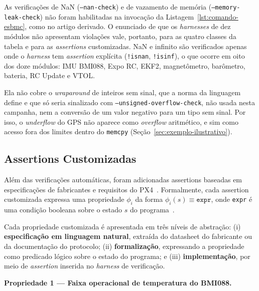 As verificações de NaN (\texttt{--nan-check}) e de vazamento de memória
(\texttt{--memory-leak-check}) não foram habilitadas na invocação da
Listagem~\ref{lst:comando-esbmc}, como no artigo derivado. O enunciado de que
os \textit{harnesses} de dez módulos não apresentam violações vale, portanto, para
as quatro classes da tabela e para as \textit{assertions} customizadas. NaN e
infinito são verificados apenas onde o \textit{harness} tem \textit{assertion}
explícita (\texttt{!isnan}, \texttt{!isinf}), o que ocorre em oito dos doze
módulos: IMU BMI088, Expo RC, EKF2, magnetômetro, barômetro, bateria, RC Update e
VTOL.

Ela não cobre o \textit{wraparound} de inteiros sem sinal, que a norma da
linguagem define e que só seria sinalizado com \texttt{--unsigned-overflow-check},
não usada nesta campanha, nem a conversão de um valor negativo para um tipo sem
sinal. Por isso, o \textit{underflow} do GPS não aparece como
\textit{overflow} aritmético, e sim como acesso fora dos limites dentro do
\texttt{memcpy} (Seção~\ref{sec:exemplo-ilustrativo}).

\subsection{Assertions Customizadas}

Além das verificações automáticas, foram adicionadas assertions baseadas em
especificações de fabricantes e requisitos do PX4~\cite{PX4_Documentation}.
Formalmente, cada assertion customizada expressa uma propriedade
$\phi_i$ da forma $\phi_i(s) \equiv \texttt{expr}$, onde \texttt{expr} é uma
condição booleana sobre o estado $s$ do programa~\cite{Cordeiro2012}.

Cada propriedade customizada é apresentada em três níveis de abstração: (i) \textbf{especificação em linguagem natural}, extraída do datasheet do fabricante ou da documentação do protocolo; (ii) \textbf{formalização}, expressando a propriedade como predicado lógico sobre o estado do programa; e (iii) \textbf{implementação}, por meio de \textit{assertion} inserida no \textit{harness} de verificação.

\textbf{Propriedade 1 --- Faixa operacional de temperatura do BMI088.}

